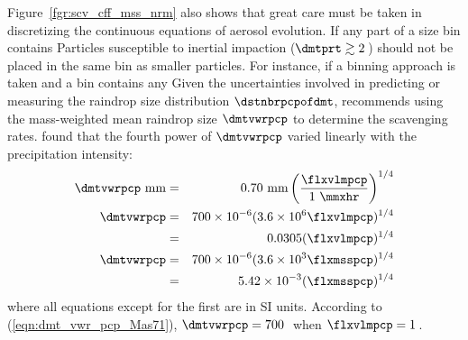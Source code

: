 \documentclass[12pt,twoside]{book}
\begin{document}
Figure~\ref{fgr:scv_cff_mss_nrm} also shows that great care must be
taken in discretizing the continuous equations of aerosol evolution.
If any part of a size bin contains 
Particles susceptible to inertial impaction ($\dmtprt \gtrsim 2$\,\um) 
should not be placed in the same bin as smaller particles.
For instance, if a binning approach is taken and a bin contains any
Given the uncertainties involved in predicting or measuring the
raindrop size distribution $\dstnbrpcpofdmt$, \cite{Sli84} recommends
using the mass-weighted mean raindrop size $\dmtvwrpcp$ to determine
the scavenging rates. 
\cite{Mas71} found that the fourth power of $\dmtvwrpcp$ varied
linearly with the precipitation intensity:
\begin{eqnarray}
\dmtvwrpcp\ \mbox{mm} & = &  
0.70\ \mbox{mm} 
\left( \frac{\flxvlmpcp}{1\ \mbox{\mmxhr} } \right)^{1/4} 
\nonumber \\
\dmtvwrpcp & = & 
700 \times 10^{-6} ( 3.6 \times 10^{6} \flxvlmpcp )^{1/4} \nonumber \\
& = & 0.0305 ( \flxvlmpcp )^{1/4} \nonumber \\
\dmtvwrpcp & = & 
700 \times 10^{-6} ( 3.6 \times 10^{3} \flxmsspcp )^{1/4} \nonumber \\
& = & 5.42 \times 10^{-3} ( \flxmsspcp )^{1/4}
\label{eqn:dmt_vwr_pcp_Mas71}
\end{eqnarray}
where all equations except for the first are in SI units.
According to (\ref{eqn:dmt_vwr_pcp_Mas71}), $\dmtvwrpcp = 700$\,\um\ 
when $\flxvlmpcp = 1$\,\mmxhr.
\end{document}
